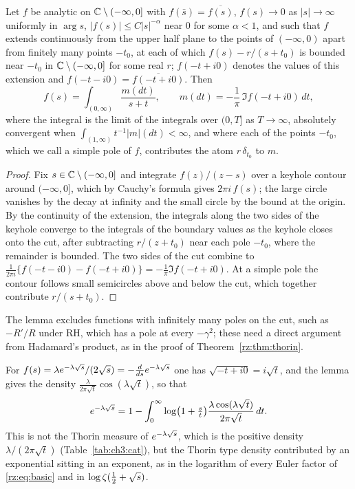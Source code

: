 \begin{lemma}\label{rz:lem:inv}
Let $f$ be analytic on $\mathbb{C}\setminus(-\infty,0]$ with $f(\bar s)=\overline{f(s)}$, $f(s)\to0$ as $|s|\to\infty$ uniformly in $\arg s$, $|f(s)|\le C|s|^{-\alpha}$ near $0$ for some $\alpha<1$, and such that $f$ extends continuously from the upper half plane to the points of $(-\infty,0)$ apart from finitely many points $-t_0$, at each of which $f(s)-r/(s+t_0)$ is bounded near $-t_0$ in $\mathbb{C}\setminus(-\infty,0]$ for some real $r$; $f(-t+i0)$ denotes the values of this extension and $f(-t-i0)=\overline{f(-t+i0)}$. Then
\[
f(s)=\int_{(0,\infty)}\frac{m(dt)}{s+t},\qquad m(dt)=-\frac1\pi\,\Im f(-t+i0)\,dt,
\]
where the integral is the limit of the integrals over $(0,T]$ as $T\to\infty$, absolutely convergent when $\int_{(1,\infty)}t^{-1}|m|(dt)<\infty$, and where each of the points $-t_0$, which we call a simple pole of $f$, contributes the atom $r\,\delta_{t_0}$ to $m$.
\end{lemma}

\begin{proof}
Fix $s\in\mathbb{C}\setminus(-\infty,0]$ and integrate $f(z)/(z-s)$ over a keyhole contour around $(-\infty,0]$, which by Cauchy's formula gives $2\pi i\,f(s)$; the large circle vanishes by the decay at infinity and the small circle by the bound at the origin. By the continuity of the extension, the integrals along the two sides of the keyhole converge to the integrals of the boundary values as the keyhole closes onto the cut, after subtracting $r/(z+t_0)$ near each pole $-t_0$, where the remainder is bounded. The two sides of the cut combine to $\frac{1}{2\pi i}\{f(-t-i0)-f(-t+i0)\}=-\frac1\pi\Im f(-t+i0)$. At a simple pole the contour follows small semicircles above and below the cut, which together contribute $r/(s+t_0)$.
\end{proof}

The lemma excludes functions with infinitely many poles on the cut, such as $-R'/R$ under RH, which has a pole at every $-\gamma^2$; these need a direct argument from Hadamard's product, as in the proof of Theorem~\ref{rz:thm:thorin}.

For $f(s)=\lambda e^{-\lambda\sqrt{s}}/(2\sqrt{s})=-\frac{d}{ds}e^{-\lambda\sqrt{s}}$ one has $\sqrt{-t+i0}=i\sqrt t$, and the lemma gives the density $\frac{\lambda}{2\pi\sqrt t}\cos(\lambda\sqrt t)$, so that
\[
e^{-\lambda\sqrt{s}}=1-\int_0^\infty\log\bigl(1+\tfrac st\bigr)\frac{\lambda\cos(\lambda\sqrt t)}{2\pi\sqrt t}\,dt .
\]
This is not the Thorin measure of $e^{-\lambda\sqrt{s}}$, which is the positive density $\lambda/(2\pi\sqrt t)$ (Table~\ref{tab:ch3:cat}), but the Thorin type density contributed by an exponential sitting in an exponent, as in the logarithm of every Euler factor of \eqref{rz:eq:basic} and in $\log\zeta(\frac12+\sqrt{s})$.

